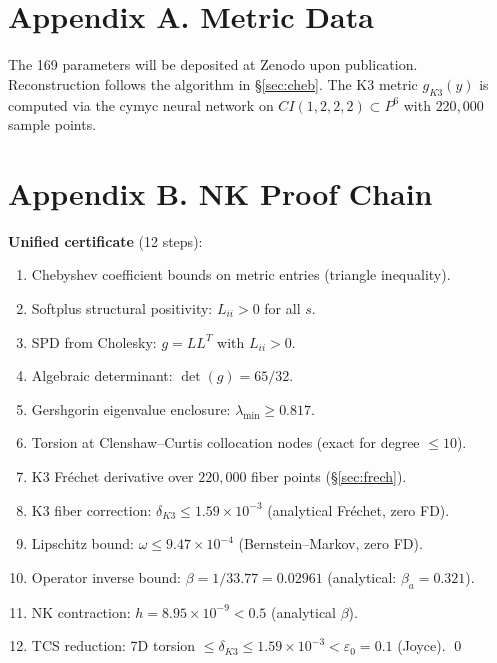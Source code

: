 \documentclass[11pt,a4paper]{article}
\theoremstyle{definition}
\theoremstyle{remark}
\newcommand{\CIvvvv}{\mathrm{CI}(1,2,2,2)}
\newcommand{\Psix}{\mathbb{P}^6}
\def\CIvvvv{CI(1,2,2,2)}%
\def\Psix{P^6}%
\begin{document}
\section*{Appendix A. Metric Data}

The 169 parameters will be deposited at Zenodo upon publication. Reconstruction follows the algorithm in §\ref{sec:cheb}. The K3 metric $g_{K3}(y)$ is computed via the cymyc neural network \cite{LarforsLukasRuehle2022} on $\CIvvvv \subset \Psix$ with $220{,}000$ sample points.

\section*{Appendix B. NK Proof Chain}

\textbf{Unified certificate} (12 steps):
\begin{enumerate}
\item Chebyshev coefficient bounds on metric entries (triangle inequality).
\item Softplus structural positivity: $L_{ii} > 0$ for all $s$.
\item SPD from Cholesky: $g = LL^T$ with $L_{ii} > 0$.
\item Algebraic determinant: $\det(g) = 65/32$.
\item Gershgorin eigenvalue enclosure: $\lambda_{\min} \geq 0.817$.
\item Torsion at Clenshaw--Curtis collocation nodes (exact for degree $\leq 10$).
\item K3 Fr\'echet derivative over $220{,}000$ fiber points (§\ref{sec:frech}).
\item K3 fiber correction: $\delta_{K3} \leq 1.59 \times 10^{-3}$ (analytical Fr\'echet, zero FD).
\item Lipschitz bound: $\omega \leq 9.47 \times 10^{-4}$ (Bernstein--Markov, zero FD).
\item Operator inverse bound: $\beta = 1/33.77 = 0.02961$ (analytical: $\beta_a = 0.321$).
\item NK contraction: $h = 8.95 \times 10^{-9} < 0.5$ (analytical $\beta$).
\item TCS reduction: 7D torsion $\leq \delta_{K3} \leq 1.59 \times 10^{-3} < \varepsilon_0 = 0.1$ (Joyce). \qed
\end{enumerate}
\end{document}
